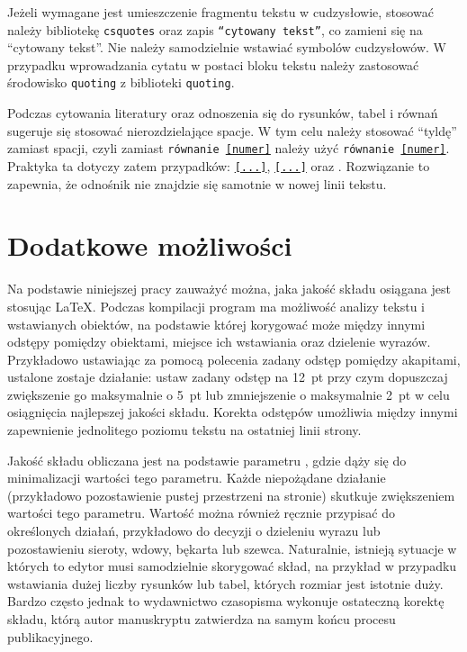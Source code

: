 Jeżeli wymagane jest umieszczenie fragmentu tekstu w cudzysłowie, stosować należy bibliotekę \texttt{csquotes} oraz zapis \texttt{\enquote{cytowany tekst}}, co zamieni się na \enquote{cytowany tekst}. Nie należy samodzielnie wstawiać symbolów cudzysłowów. W przypadku wprowadzania cytatu w postaci bloku tekstu należy zastosować środowisko \texttt{quoting} z biblioteki \texttt{quoting}.

Podczas cytowania literatury oraz odnoszenia się do rysunków, tabel i równań sugeruje się stosować nierozdzielające spacje. W tym celu należy stosować \enquote{tyldę} zamiast spacji, czyli zamiast \texttt{równanie \eqref{numer}} należy użyć \texttt{równanie~\eqref{numer}}. Praktyka ta dotyczy zatem przypadków: \texttt{\eqref{...}}, \texttt{\ref{...}} oraz \texttt{\cite{...}}. Rozwiązanie to zapewnia, że odnośnik nie znajdzie się samotnie w nowej linii tekstu.

\section{Dodatkowe możliwości}

Na podstawie niniejszej pracy zauważyć można, jaka jakość składu osiągana jest stosując \LaTeX{}. Podczas kompilacji program ma możliwość analizy tekstu i wstawianych obiektów, na podstawie której korygować może między innymi odstępy pomiędzy obiektami, miejsce ich wstawiania oraz dzielenie wyrazów. Przykładowo ustawiając za pomocą polecenia \texttt{\setlength{\parskip}{12pt plus 5pt minus 2pt}} zadany odstęp pomiędzy akapitami, ustalone zostaje działanie: ustaw zadany odstęp na \qty{12}{pt} przy czym dopuszczaj zwiększenie go maksymalnie o \qty{5}{pt} lub zmniejszenie o maksymalnie \qty{2}{pt} w celu osiągnięcia najlepszej jakości składu. Korekta odstępów umożliwia między innymi zapewnienie jednolitego poziomu tekstu na ostatniej linii strony.

Jakość składu obliczana jest na podstawie parametru \texttt{\badness}, gdzie dąży się do minimalizacji wartości tego parametru. Każde niepożądane działanie (przykładowo pozostawienie pustej przestrzeni na stronie) skutkuje zwiększeniem wartości tego parametru. Wartość \texttt{\badness} można również ręcznie przypisać do określonych działań, przykładowo do decyzji o dzieleniu wyrazu lub pozostawieniu sieroty, wdowy, bękarta lub szewca. Naturalnie, istnieją sytuacje w których to edytor musi samodzielnie skorygować skład, na przykład w przypadku wstawiania dużej liczby rysunków lub tabel, których rozmiar jest istotnie duży. Bardzo często jednak to wydawnictwo czasopisma wykonuje ostateczną korektę składu, którą autor manuskryptu zatwierdza na samym końcu procesu publikacyjnego.


